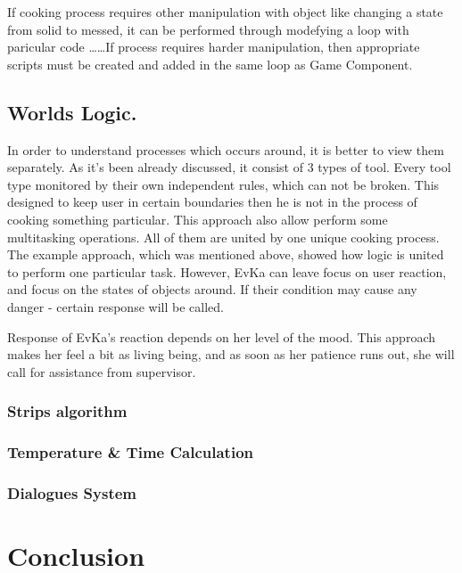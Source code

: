 \documentclass[18pt]{article}
\numberwithin{equation}{section} %
\numberwithin{figure}{section} %
\numberwithin{table}{section} %
\begin{document}
		If cooking process requires other manipulation with object like changing a state from solid to messed, it can be performed through modefying a loop with paricular code \ldots \ldots If process requires harder manipulation, then appropriate scripts must be created and added in the same loop as Game Component. 
		
	\subsection{Worlds Logic.}
		In order to understand processes which occurs around, it is better to view them separately. As it's been already discussed, it consist of 3 types of tool. Every tool type monitored by their own independent rules, which can not be broken. This designed to keep user in certain boundaries then he is not in the process of cooking something particular. This approach also allow perform some multitasking operations. All of them are united by one unique cooking process. The example approach, which was mentioned above, showed how logic is united to perform one particular task. However, EvKa can leave focus on user reaction, and focus on the states of objects around. If their condition may cause any danger - certain response will be called.
		
		Response of EvKa's reaction depends on her level of the mood. This approach makes her feel a bit as living being, and as soon as her patience runs out, she will call for assistance from supervisor.
	\subsubsection{Strips algorithm}
	\subsubsection{Temperature \& Time Calculation}
	\subsubsection{Dialogues System}
	
\section{Conclusion}
\end{document}
